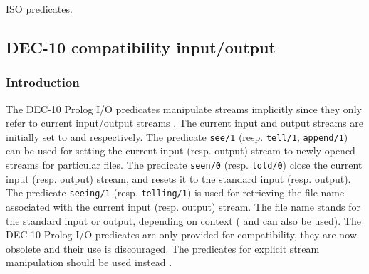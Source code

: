 \begin{PlErrors}








\end{PlErrors}

\Portability

ISO predicates.
\fi

\subsection{DEC-10 compatibility input/output}

\subsubsection{Introduction}
The DEC-10 Prolog I/O predicates manipulate streams implicitly since they
only refer to current input/output streams .
The current input and output streams are initially set to
 and  respectively. The predicate
\texttt{see/1}
(resp. \texttt{tell/1}, \texttt{append/1}) can be used for setting the
current input (resp. output) stream to newly opened streams for
particular files. The predicate \texttt{seen/0}
(resp. \texttt{told/0}) close the current input (resp. output) stream,
and resets it to the standard input (resp. output). The predicate
\texttt{seeing/1} (resp. \texttt{telling/1}) is used for retrieving
the file name associated with the current input (resp. output)
stream. The file name  stands for the standard input or
output, depending on context ( and
 can also be used). The DEC-10 Prolog I/O predicates
are only provided for compatibility, they are now obsolete and
their use is discouraged. The predicates for explicit stream manipulation
should be used instead .

